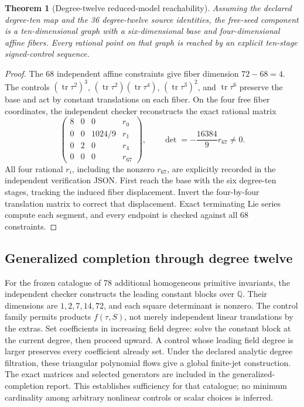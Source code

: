 \documentclass[11pt]{article}
\newtheorem{theorem}{Theorem}
\newcommand{\QQ}{\mathbb Q}
\newcommand{\tr}{\operatorname{tr}}
\begin{document}
\begin{theorem}[Degree-twelve reduced-model reachability]
Assuming the declared degree-ten map and the 36 degree-twelve source identities,
the free-seed component is a ten-dimensional graph with a six-dimensional base
and four-dimensional affine fibers. Every rational point on that graph is
reached by an explicit ten-stage signed-control sequence.
\end{theorem}
\begin{proof}
The 68 independent affine constraints give fiber dimension $72-68=4$.
The controls $(\tr\tau^2)^3$, $(\tr\tau^2)(\tr\tau^4)$,
$(\tr\tau^3)^2$, and $\tr\tau^6$ preserve the base and act by constant
translations on each fiber. On the four free fiber coordinates, the independent
checker reconstructs the exact rational matrix
\begin{equation}
 \begin{pmatrix}
 8&0&0&r_0\\0&0&1024/9&r_1\\0&2&0&r_4\\0&0&0&r_{67}
 \end{pmatrix},\qquad \det=-\frac{16384}{9}r_{67}\ne0.
\end{equation}
All four rational $r_i$, including the nonzero $r_{67}$, are explicitly
recorded in the independent verification JSON. First reach the base with the
six degree-ten stages, tracking the induced fiber displacement. Invert the
four-by-four translation matrix to correct that displacement. Exact
terminating Lie series compute each segment, and every endpoint is checked
against all 68 constraints.
\end{proof}

\subsection{Generalized completion through degree twelve}
For the frozen catalogue of 78 additional homogeneous primitive invariants,
the independent checker constructs the leading constant blocks over $\QQ$.
Their dimensions are $1,2,7,14,72$, and each square determinant is nonzero.
The control family permits products $f(\tau,S)$, not merely independent linear
translations by the extras. Set coefficients in increasing field degree:
solve the constant block at the current degree, then proceed upward. A control
whose leading field degree is larger preserves every coefficient already set.
Under the declared analytic degree filtration, these triangular polynomial
flows give a global finite-jet construction. The exact matrices and selected
generators are included in the generalized-completion report. This establishes
sufficiency for that catalogue; no minimum cardinality among arbitrary nonlinear
controls or scalar choices is inferred.
\end{document}
